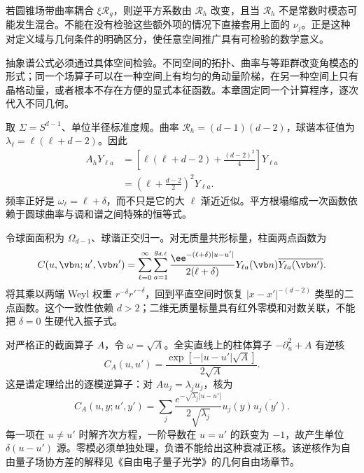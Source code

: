 若圆锥场带曲率耦合 $\xi\mathcal R_g$，则逆平方系数由 $\mathcal R_h$ 改变，且当 $\mathcal R_h$ 不是常数时模态可能发生混合。不能在没有检验这些额外项的情况下直接套用上面的 $\nu_j$。正是这种对定义域与几何条件的明确区分，使任意空间推广具有可检验的数学意义。

抽象谱公式必须通过具体空间检验。不同空间的拓扑、曲率与等距群改变角模态的形式；同一个场算子可以在一种空间上有均匀的角动量阶梯，在另一种空间上只有晶格动量，或者根本不存在方便的显式本征函数。本章固定同一个计算程序，逐次代入不同几何。

取 $\Sigma=S^{d-1}$、单位半径标准度规。曲率 $\mathcal R_h=(d-1)(d-2)$，球谐本征值为 $\lambda_\ell=\ell(\ell+d-2)$。因此
\begin{align}
 A_hY_{\ell a}&=\left[\ell(\ell+d-2)+\frac{(d-2)^2}{4}\right]Y_{\ell a}\nonumber\\
 &=\left(\ell+\frac{d-2}{2}\right)^2Y_{\ell a}.
 \label{eq:ghs-sphere-perfect-square-general}
\end{align}
频率正好是 $\omega_\ell=\ell+\delta$，而不只是它的大 $\ell$ 渐近近似。平方根塌缩成一次函数依赖于圆球曲率与调和谱之间特殊的恒等式。

令球面面积为 $\Omega_{d-1}$、球谐正交归一。对无质量共形标量，柱面两点函数为
\begin{equation}\label{eq:ghs-sphere-cylinder-correlator}
 C(u,\vb n;u',\vb n')
 =\sum_{\ell=0}^\infty\sum_{a=1}^{g_{d,\ell}}
 \frac{\ee^{-(\ell+\delta)|u-u'|}}{2(\ell+\delta)}
 Y_{\ell a}(\vb n)\overline{Y_{\ell a}(\vb n')}.
\end{equation}
将其乘以两端 Weyl 权重 $r^{-\delta}r'^{-\delta}$，回到平直空间时恢复 $|x-x'|^{-(d-2)}$ 类型的二点函数。这个一致性依赖 $d>2$；二维无质量标量具有红外零模和对数关联，不能把 $\delta=0$ 生硬代入振子式。

对严格正的截面算子 $A$，令 $\omega=\sqrt A$。全实直线上的柱体算子 $-\partial_u^2+A$ 有逆核
\begin{equation}\label{eq:math-ghs-positive-cylinder-kernel}
 C_A(u,u')=\frac{\exp[-|u-u'|\sqrt A]}{2\sqrt A}.
\end{equation}
这是谱定理给出的逐模逆算子：对 $Au_j=\lambda_ju_j$，核为
\[
 C_A(u,y;u',y')=\sum_j\frac{e^{-\sqrt{\lambda_j}|u-u'|}}{2\sqrt{\lambda_j}}
 u_j(y)\overline{u_j(y')}.
\]
每一项在 $u\ne u'$ 时解齐次方程，一阶导数在 $u=u'$ 的跃变为 $-1$，故产生单位 $\delta(u-u')$ 源。零模必须单独处理，负谱不能给出这种衰减正核。该逆核作为自由量子场协方差的解释见《自由电子量子光学》的几何自由场章节。

